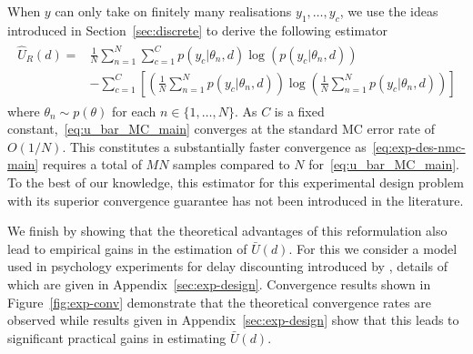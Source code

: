 When $y$ can only take on finitely many realisations $y_{1},\dots,y_c$, we use the ideas introduced
in Section~\ref{sec:discrete} to derive the following estimator
\begin{align}
\begin{split}
\label{eq:u_bar_MC_main}
\hat{U}_{R}(d) = &\frac{1}{N} \sum_{n=1}^{N} \sum_{c=1}^{C} p(y_c | \theta_n, d) \log\left(p(y_c | \theta_n, d)\right) \\
&- \sum_{c=1}^{C} \left[\left(\frac{1}{N}\sum_{n=1}^{N} p(y_c | \theta_n, d)\right) \log \left(\frac{1}{N} \sum_{n=1}^{N} p(y_c | \theta_n, d)\right) \right]
\end{split}
\end{align}
where $\theta_n \sim p(\theta)$ for each $n \in \{1,\dots,N\}$.  
As $C$ is a fixed
constant,~\eqref{eq:u_bar_MC_main} converges at the standard MC error rate of $O(1/N)$.  This constitutes
a substantially faster convergence as~\eqref{eq:exp-des-nmc-main} requires a total of $MN$
samples compared to $N$ for~\eqref{eq:u_bar_MC_main}.  To the best of our knowledge, this estimator for this experimental design problem with its superior convergence guarantee has not been introduced in the literature.

We finish by showing that the theoretical advantages of this reformulation also lead to empirical gains in the estimation of $\bar{U}(d)$.  For this we consider a model used in psychology experiments for delay discounting introduced by \cite{vincent2016hierarchical}, details of which are given in Appendix~\ref{sec:exp-design}.  Convergence results
shown in Figure~\ref{fig:exp-conv} demonstrate that the theoretical convergence rates
are observed while results given in Appendix~\ref{sec:exp-design} show that this leads to significant practical gains 
in estimating $\bar{U}(d)$.

